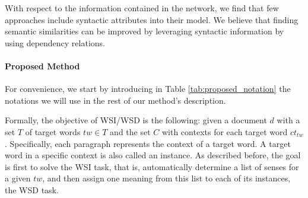 %



With respect to the information contained in the network, we find that few approaches include syntactic attributes into their model. We believe that finding semantic similarities can be improved by leveraging syntactic information by using dependency relations. 




\paragraph{Proposed Method}
	
For convenience, we start by introducing in Table \ref{tab:proposed_notation} the notations we will use in the rest of our method's description.

Formally, the objective of WSI/WSD is the following: given a document $d$ with a set $T$ of  target words $tw \in T$ and the set $C$ with contexts for each target word $ct_{tw}$. 
Specifically, each paragraph represents the context  of a target word. A target word in a specific context is also called an instance.
As described before, the goal is first to solve the WSI task, that is, automatically determine a list of senses for a given $tw$, and then assign one meaning from this list to each of its instances, the WSD task.
%


